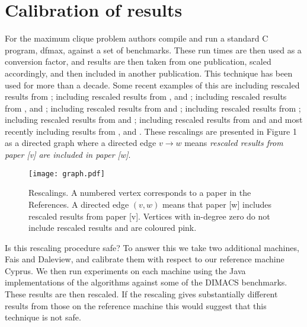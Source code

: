 \documentclass[runningheads]{llncs}
\begin{document}
\section{Calibration of results}
\vspace{-1.5mm}
For the maximum clique problem authors compile and run a standard C program, dfmax, against a 
set of benchmarks. These run times are then used as a conversion factor, 
and results are then taken from one publication, scaled accordingly, and then included in another publication. This 
technique has been used for more than a decade. Some recent examples of this are
\cite{prjo2002} including rescaled results from \cite{sewell98};
\cite{regin2003} including rescaled results from \cite{prjo2002}, \cite{wood97} and \cite{fahle};
\cite{tomita2007} including rescaled results from \cite{prjo2002}, \cite{fahle} and \cite{sewell98};
\cite{tomita2010} including rescaled results from \cite{regin2003} and \cite{prjo2002};
\cite{segundo2011} including rescaled  results from \cite{Konc_Janezic_2007}; 
\cite{segundo2011b} including rescaled  results from \cite{segundo2011} and \cite{tomita2010};
\cite{aaai2010} including rescaled results from \cite{tomita2007} and \cite{regin2003} and most recently
\cite{MCMD14} including results from \cite{segundo2011}, \cite{segundo2011b} and \cite{tomita2010}.
These rescalings are presented in Figure 1 as a directed graph where a directed edge $v \longrightarrow w$ means 
\emph{rescaled results from paper [v] are included in paper [w]}.

\begin{figure}
\begin{center}
 \texttt{[image: graph.pdf]}
\vspace{-20mm}
 \caption{Rescalings. A numbered vertex corresponds to a paper in the References. A directed edge $(v,w)$ means that paper [w] includes rescaled results from paper [v]. Vertices with in-degree
zero do not include rescaled results and are coloured pink.}
 \end{center}
\label{graph}
\end{figure}

Is this rescaling procedure safe?
To answer this we take two additional machines, Fais and Daleview, and calibrate them with respect to our reference machine Cyprus. 
We then run experiments 
on each machine using the Java implementations of the algorithms against some of the DIMACS benchmarks. These results are
then rescaled. If the rescaling gives substantially different results from those on the reference machine
this would suggest that this technique is not safe.
\end{document}
